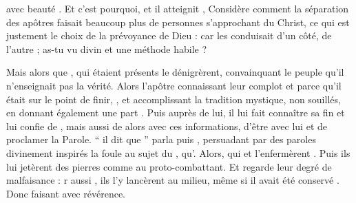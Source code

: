  avec beauté .
Et c'est pourquoi,  %
et il atteignit ,
Considère comment la séparation des apôtres faisait beaucoup plus de personnes s'approchant du Christ, 
 ce qui est justement le choix de la prévoyance de Dieu : car   les conduisait d'un côté,  de l'autre ; as-tu vu  divin et une méthode habile ?
 
Mais alors que   ,  qui étaient présents le dénigrèrent, convainquant le peuple qu'il n'enseignait pas la vérité.
Alors l'apôtre connaissant  leur complot et parce qu'il était sur le point de finir, , et accomplissant la tradition mystique,    non souillés, en donnant également une part .
Puis   auprès de lui, il lui fait connaître sa fin et  lui confie de , mais aussi de  alors  avec ces informations, d'être avec lui et de proclamer la Parole. \enquote{ il dit que }
 parla puis , persuadant par des paroles divinement inspirés la foule au sujet du , qu'.
Alors,   qui  et l'enfermèrent . Puis  ils lui jetèrent des pierres comme au proto-combattant.
Et regarde leur degré de malfaisance : r aussi , ils l'y lancèrent au milieu, même si il avait été conservé .  Donc  faisant  avec révérence.
